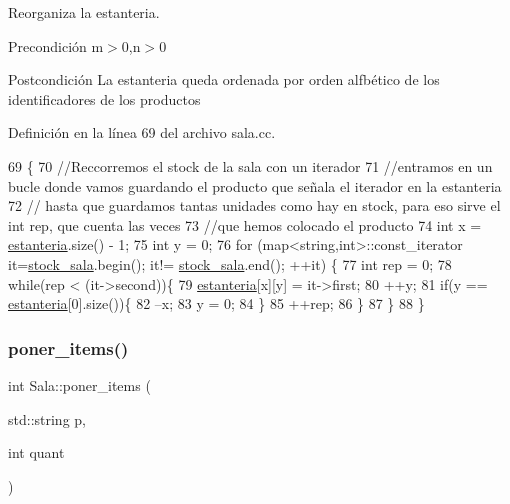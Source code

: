 Reorganiza la estanteria. 

\begin{DoxyPrecond}{Precondición}
m$>$0,n$>$0 
\end{DoxyPrecond}
\begin{DoxyPostcond}{Postcondición}
La estanteria queda ordenada por orden alfbético de los identificadores de los productos 
\end{DoxyPostcond}


Definición en la línea 69 del archivo sala.\+cc.


\begin{DoxyCode}
69                        \{
70     \textcolor{comment}{//Reccorremos el stock de la sala con un iterador}
71     \textcolor{comment}{//entramos en un bucle donde vamos guardando el producto que señala el iterador en la estanteria}
72     \textcolor{comment}{// hasta que guardamos tantas unidades como hay en stock, para eso sirve el int rep, que cuenta las
       veces}
73     \textcolor{comment}{//que hemos colocado el producto}
74     \textcolor{keywordtype}{int} x = \mbox{\hyperlink{class_sala_a8f5264818c98db9c0d075c51a7672d95}{estanteria}}.size() - 1;
75     \textcolor{keywordtype}{int} y = 0;
76     \textcolor{keywordflow}{for} (map<string,int>::const\_iterator it=\mbox{\hyperlink{class_sala_a7c9511997ba4a6fac93625fd3f5c7703}{stock\_sala}}.begin(); it!=
      \mbox{\hyperlink{class_sala_a7c9511997ba4a6fac93625fd3f5c7703}{stock\_sala}}.end(); ++it) \{
77         \textcolor{keywordtype}{int} rep = 0;
78         \textcolor{keywordflow}{while}(rep < (it->second))\{
79             \mbox{\hyperlink{class_sala_a8f5264818c98db9c0d075c51a7672d95}{estanteria}}[x][y] = it->first;
80             ++y;
81             \textcolor{keywordflow}{if}(y == \mbox{\hyperlink{class_sala_a8f5264818c98db9c0d075c51a7672d95}{estanteria}}[0].size())\{
82                 --x;
83                 y = 0;
84             \}
85             ++rep; 
86         \}
87     \}   
88 \}
\end{DoxyCode}
\mbox{\label{class_sala_aa65c68be5f5242570063fc5f0e8dafa2}} 
\subsubsection{\texorpdfstring{poner\+\_\+items()}{poner\_items()}}
{\footnotesize\ttfamily int Sala\+::poner\+\_\+items (\begin{DoxyParamCaption}\item[{std\+::string}]{p,  }\item[{int}]{quant }\end{DoxyParamCaption})}



